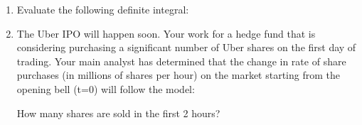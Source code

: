\documentclass[letterpaper,12pt,fleqn]{article}
\begin{document}
\begin{enumerate}[left=0pt]
\item Evaluate the following definite integral:

  \bigskip

  \begin{center}
  \end{center}

  \bigskip

\item The Uber IPO will happen soon.  Your work for a hedge fund that is considering purchasing a significant number of Uber
  shares on the first day of trading.  Your main analyst has determined that the change in rate of share purchases (in
  millions of shares per hour) on the market starting from the opening bell (t=0) will follow the model:

  \bigskip

  \begin{center}
  \end{center}

  \bigskip

  How many shares are sold in the first 2 hours?
\end{enumerate}
\end{document}
